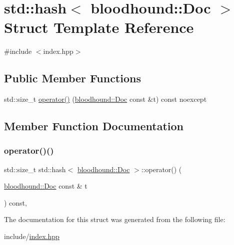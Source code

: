 \hypertarget{structstd_1_1hash_3_01bloodhound_1_1Doc_01_4}{}\section{std\+:\+:hash$<$ bloodhound\+:\+:Doc $>$ Struct Template Reference}
\label{structstd_1_1hash_3_01bloodhound_1_1Doc_01_4}


{\ttfamily \#include $<$index.\+hpp$>$}

\subsection*{Public Member Functions}
\begin{DoxyCompactItemize}
\item 
std\+::size\+\_\+t \hyperlink{structstd_1_1hash_3_01bloodhound_1_1Doc_01_4_a3f89deb7b2548010c7f3b63afc9d7fa4}{operator()} (\hyperlink{structbloodhound_1_1Doc}{bloodhound\+::\+Doc} const \&t) const noexcept
\end{DoxyCompactItemize}


\subsection{Member Function Documentation}
\mbox{\label{structstd_1_1hash_3_01bloodhound_1_1Doc_01_4_a3f89deb7b2548010c7f3b63afc9d7fa4}} 
\subsubsection{\texorpdfstring{operator()()}{operator()()}}
{\footnotesize\ttfamily std\+::size\+\_\+t std\+::hash$<$ \hyperlink{structbloodhound_1_1Doc}{bloodhound\+::\+Doc} $>$\+::operator() (\begin{DoxyParamCaption}\item[{\hyperlink{structbloodhound_1_1Doc}{bloodhound\+::\+Doc} const \&}]{t }\end{DoxyParamCaption}) const\hspace{0.3cm}{\ttfamily [inline]}, {\ttfamily [noexcept]}}



The documentation for this struct was generated from the following file\+:\begin{DoxyCompactItemize}
\item 
include/\hyperlink{index_8hpp}{index.\+hpp}\end{DoxyCompactItemize}
